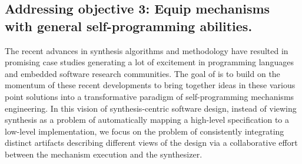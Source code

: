 






\subsection{Addressing objective 3: Equip mechanisms with general self-programming abilities.}


The recent advances in synthesis algorithms and methodology have resulted in promising case studies generating a lot of excitement in programming languages and embedded software research communities. The goal of \project is to build on the momentum of these recent developments to bring together ideas in these various point solutions into a transformative paradigm of self-programming mechanisms engineering. In this vision of synthesis-centric software design, instead of viewing synthesis as a problem of automatically mapping a high-level specification to a low-level implementation, we focus on the problem of consistently integrating distinct artifacts describing different views of the design via a collaborative effort between the mechanism execution and the synthesizer.



